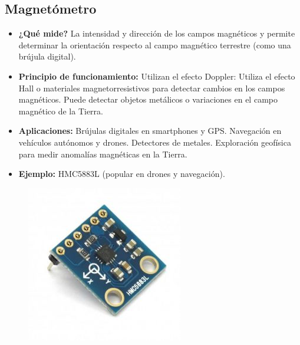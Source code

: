 \subsection*{Magnetómetro}
\begin{itemize}
	\item \textbf{¿Qué mide?} La intensidad y dirección de los campos magnéticos y permite determinar la orientación respecto al campo magnético terrestre (como una brújula digital).
	\item \textbf{Principio de funcionamiento:} Utilizan el efecto Doppler: Utiliza el efecto Hall o materiales magnetorresistivos para detectar cambios en los campos magnéticos.
	Puede detectar objetos metálicos o variaciones en el campo magnético de la Tierra.
	\item \textbf{Aplicaciones:} Brújulas digitales en smartphones y GPS.
	Navegación en vehículos autónomos y drones.
	Detectores de metales.
	Exploración geofísica para medir anomalías magnéticas en la Tierra.
	\item \textbf{Ejemplo:} HMC5883L (popular en drones y navegación).
\end{itemize}
\begin{figure}[h]
	\centering
	\includegraphics[width=0.3\linewidth]{img/magnetometro}
	\label{fig:magnetometro}
\end{figure}
